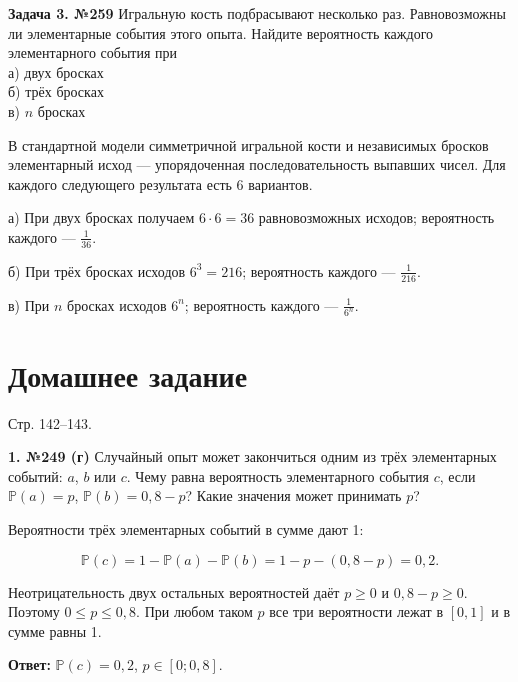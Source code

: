 \begin{task}\label{task-problems-3}
\textbf{Задача 3. №259} Игральную кость подбрасывают несколько раз. Равновозможны ли элементарные события этого опыта. Найдите вероятность каждого элементарного события при\\
 а) двух бросках\\
 б) трёх бросках\\
 в) $n$ бросках
\end{task}

\begin{solution}\label{solution-random-events-problems-3}
В стандартной модели симметричной игральной кости и независимых бросков элементарный исход — упорядоченная последовательность выпавших чисел. Для каждого следующего результата есть 6 вариантов.

а) При двух бросках получаем $6\cdot6=36$ равновозможных исходов; вероятность каждого — $\frac1{36}$.

б) При трёх бросках исходов $6^3=216$; вероятность каждого — $\frac1{216}$.

в) При $n$ бросках исходов $6^n$; вероятность каждого — $\frac1{6^n}$.
\end{solution}

\section{Домашнее задание}

Стр. 142–143.

\begin{task}\label{task-homework-1}
\textbf{1. №249 (г)} Случайный опыт может закончиться одним из трёх элементарных событий: $a$, $b$ или $c$. Чему равна вероятность элементарного события $c$, если $\mathbb{P}(a)=p$, $\mathbb{P}(b)=0,8-p$? Какие значения может принимать $p$?
\end{task}

\begin{solution}\label{solution-random-events-homework-1}
Вероятности трёх элементарных событий в сумме дают 1:

\[\mathbb P(c)=1-\mathbb P(a)-\mathbb P(b)=1-p-(0,8-p)=0,2.\]

Неотрицательность двух остальных вероятностей даёт $p\ge0$ и $0,8-p\ge0$. Поэтому $0\le p\le0,8$. При любом таком $p$ все три вероятности лежат в $[0,1]$ и в сумме равны 1.

\textbf{Ответ:} $\mathbb P(c)=0,2$, $p\in[0;0,8]$.
\end{solution}

